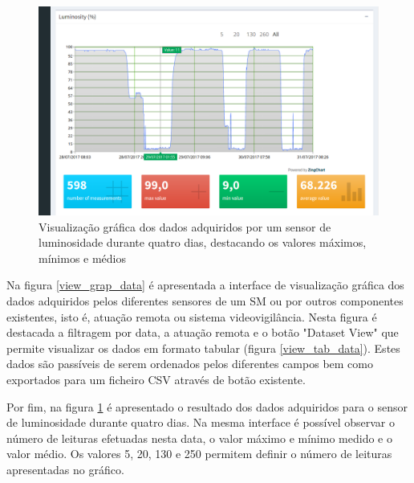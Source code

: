 \begin{figure}[h]
	\centering
	\includegraphics[width=0.9\linewidth]{prints-web/humidity.png}
	\caption{Visualização gráfica dos dados adquiridos por um sensor de luminosidade durante quatro dias, destacando os valores máximos, mínimos e médios}
	\label{grafico_humidade}
\end{figure}



Na figura \ref{view_grap_data} é apresentada a interface de visualização gráfica dos dados adquiridos pelos diferentes sensores de um \acl{SM} ou por outros componentes existentes, isto é, atuação remota ou sistema videovigilância. Nesta figura é destacada a filtragem por data, a atuação remota e o botão "Dataset View" que permite visualizar os dados em formato tabular (figura \ref{view_tab_data}). Estes dados são passíveis de serem ordenados pelos diferentes campos bem como exportados para um ficheiro \ac{CSV} através de botão existente. 


Por fim, na figura \ref{grafico_humidade} é apresentado o resultado dos dados adquiridos para o sensor de luminosidade durante quatro dias. Na mesma interface é possível observar o número de leituras efetuadas nesta data, o valor máximo e mínimo medido e o valor médio. Os valores 5, 20, 130 e 250 permitem definir o número de leituras apresentadas no gráfico. 

 

